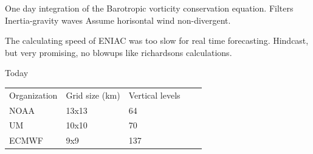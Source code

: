 \begin{frame}{}
{One day integration of the Barotropic vorticity conservation equation.
Filters Inertia-gravity waves
Assume horisontal wind non-divergent.

The calculating speed of ENIAC was too slow for real time forecasting.
Hindcast, but very promising, no blowups like richardsons calculations.
}




\end{frame}

\begin{frame}{Today}

  \begin{table}[]
  \begin{tabular}{|l|l|l|ll}
  \cline{1-3}
  Organization & Grid size (km) & Vertical levels &  &  \\ \cline{1-3}
  NOAA         & 13x13          & 64              &  &  \\ \cline{1-3}
  UM           & 10x10          & 70              &  &  \\ \cline{1-3}
  ECMWF        & 9x9            & 137             &  &  \\ \cline{1-3}
  \end{tabular}

  \parencite{nwp}
  \end{table}

\end{frame}




